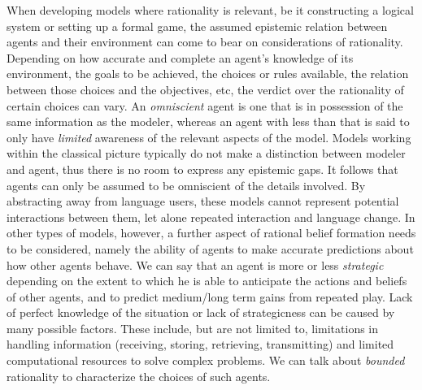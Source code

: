 \documentclass[a4paper]{article}
\begin{document}
When developing models where rationality is relevant, be it constructing a logical system or setting up a formal game, the assumed epistemic relation between agents and their environment can come to bear on considerations of rationality.
Depending on how accurate and complete an agent's knowledge of its environment, the goals to be achieved, the choices or rules available, the relation between those choices and the objectives, etc, the verdict over the rationality of certain choices can vary.
An \emph{omniscient} agent is one that is in possession of the same information as the modeler, whereas an agent with less than that is said to only have \emph{limited} awareness of the relevant aspects of the model.
Models working within the classical picture typically do not make a distinction between modeler and agent, thus there is no room to express any epistemic gaps.
It follows that agents can only be assumed to be omniscient of the details involved.
By abstracting away from language users, these models cannot represent potential interactions between them, let alone repeated interaction and language change.
In other types of models, however, a further aspect of rational belief formation needs to be considered, namely the ability of agents to make accurate predictions about how other agents behave.
We can say that an agent is more or less \emph{strategic} depending on the extent to which he is able to anticipate the actions and beliefs of other agents, and to predict medium/long term gains from repeated play.
Lack of perfect knowledge of the situation or lack of strategicness can be caused by many possible factors.
These include, but are not limited to, limitations in handling information (receiving, storing, retrieving, transmitting) and limited computational resources to solve complex problems.
We can talk about \emph{bounded} rationality to characterize the choices of such agents.


\end{document}
